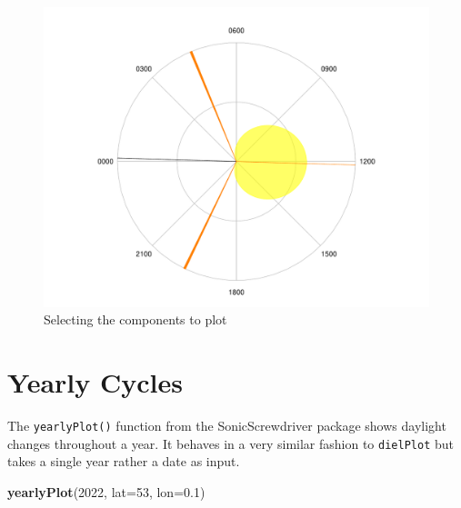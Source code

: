 \documentclass[
]{book}
\newenvironment{Shaded}{\begin{snugshade}}{\end{snugshade}}
\newcommand{\AttributeTok}[1]{\textcolor[rgb]{0.13,0.29,0.53}{#1}}
\newcommand{\DecValTok}[1]{\textcolor[rgb]{0.00,0.00,0.81}{#1}}
\newcommand{\FloatTok}[1]{\textcolor[rgb]{0.00,0.00,0.81}{#1}}
\newcommand{\FunctionTok}[1]{\textcolor[rgb]{0.13,0.29,0.53}{\textbf{#1}}}
\newcommand{\NormalTok}[1]{#1}
\begin{document}
\begin{figure}

{\centering \includegraphics[width=0.9\linewidth]{_main_files/figure-latex/diel-plot-components-1} 

}

\caption{Selecting the components to plot}\label{fig:diel-plot-components}
\end{figure}

\hypertarget{yearly-cycles}{%
\section{Yearly Cycles}\label{yearly-cycles}}

The \texttt{yearlyPlot()} function from the SonicScrewdriver package shows daylight changes throughout a year. It behaves in a very similar fashion to \texttt{dielPlot} but takes a single year rather a date as input.

\begin{Shaded}
\begin{Highlighting}[]
\FunctionTok{yearlyPlot}\NormalTok{(}\DecValTok{2022}\NormalTok{, }\AttributeTok{lat=}\DecValTok{53}\NormalTok{, }\AttributeTok{lon=}\FloatTok{0.1}\NormalTok{)}
\end{Highlighting}
\end{Shaded}
\end{document}
